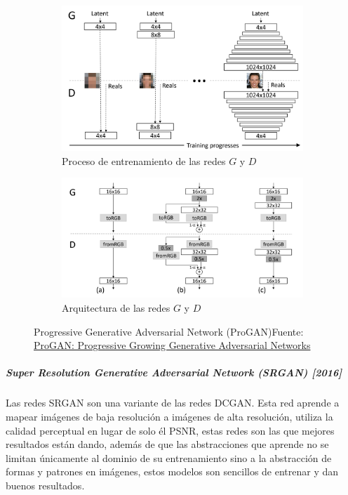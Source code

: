 \begin{figure}[H]
    \centering
    \captionsetup{justification=centering}

    \begin{subfigure}{.475\linewidth}
        \centering
        \includegraphics[width=0.75\linewidth]{figures/chapter02/ProGAN-image-32.png}
        \caption{Proceso de entrenamiento de las redes ${G}$ y ${D}$}
        \label{subfig:ProGAN-1}
    \end{subfigure}\hfill
    \begin{subfigure}{.475\linewidth}
        \centering
        \includegraphics[width=0.75\linewidth]{figures/chapter02/ProGAN-image-16.png}
        \caption{Arquitectura de las redes ${G}$ y ${D}$}
        \label{subfig:ProGAN-2}
    \end{subfigure}

    \caption{Progressive Generative Adversarial Network (ProGAN)\newline{}Fuente: \href{https://blog.paperspace.com/progan/}{ProGAN: Progressive Growing Generative Adversarial Networks}}
    \label{fig:ProGAN}
\end{figure}


\subparagraph*{Super Resolution Generative Adversarial Network (SRGAN) [2016]}
Las redes \gls{SRGAN} \cite{SRGAN-ledig2017photorealistic} son una variante de las redes \gls{DCGAN}. Esta red aprende a mapear imágenes de baja resolución a imágenes de alta resolución, utiliza la calidad perceptual en lugar de solo él \gls{PSNR}, estas redes son las que mejores resultados están dando, además de que las abstracciones que aprende no se limitan únicamente al dominio de su entrenamiento sino a la abstracción de formas y patrones en imágenes, estos modelos son sencillos de entrenar y dan buenos resultados.

